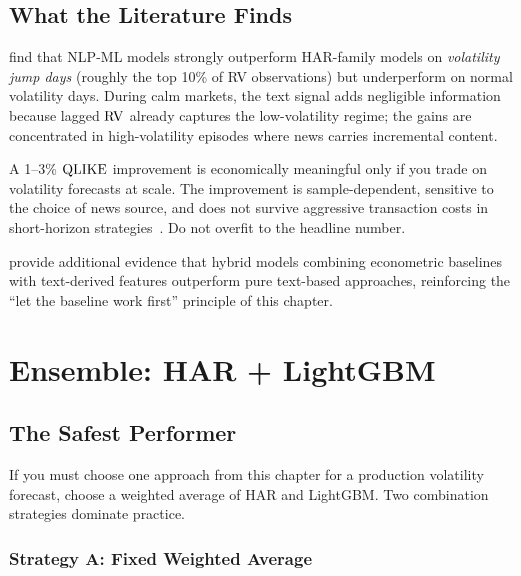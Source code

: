 \subsection{What the Literature Finds}

\citet{RahimikiaZohrenPoon2021NLP} find that NLP-ML models
strongly outperform HAR-family models on \emph{volatility jump days}
(roughly the top 10\% of RV observations) but underperform on normal
volatility days.  During calm markets, the text signal adds
negligible information because lagged $\operatorname{RV}$ already captures the
low-volatility regime; the gains are concentrated in high-volatility
episodes where news carries incremental content.

\begin{warning}
A 1--3\% $\operatorname{QLIKE}$ improvement is economically meaningful only if you
trade on volatility forecasts at scale.  The improvement is
sample-dependent, sensitive to the choice of news source, and does not
survive aggressive transaction costs in short-horizon
strategies~\citep{RahimikiaZohrenPoon2021NLP}.  Do not overfit to the
headline number.
\end{warning}

\citet{RahimikiaPoon2020} provide additional evidence that hybrid models
combining econometric baselines with text-derived features outperform
pure text-based approaches, reinforcing the ``let the baseline work
first'' principle of this chapter.


\section{Ensemble: HAR + LightGBM}\label{sec:hybrid:ensemble}

\subsection{The Safest Performer}

If you must choose one approach from this chapter for a production
volatility forecast, choose a weighted average of HAR and LightGBM.
Two combination strategies dominate practice.

\subsubsection{Strategy A: Fixed Weighted Average}

